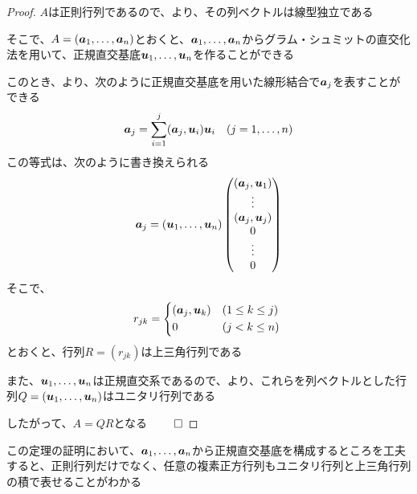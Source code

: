 \documentclass[../../../topic_linear-algebra]{subfiles}
\begin{document}
\begin{proof}
  $A$は正則行列であるので、より、その列ベクトルは線型独立である

  そこで、$A = (\vb*{a}_1,\ldots,\vb*{a}_n)$とおくと、$\vb*{a}_1,\ldots,\vb*{a}_n$からグラム・シュミットの直交化法を用いて、正規直交基底$\vb*{u}_1,\ldots,\vb*{u}_n$を作ることができる

  \br

  このとき、より、次のように正規直交基底を用いた線形結合で$\vb*{a}_j$を表すことができる
  \begin{equation*}
    \vb*{a}_j = \sum_{i=1}^j (\vb*{a}_j, \vb*{u}_i) \vb*{u}_i \quad (j = 1,\ldots,n)
  \end{equation*}
  この等式は、次のように書き換えられる
  \begin{equation*}
    \vb*{a}_j = (\vb*{u}_1,\ldots,\vb*{u}_n) \begin{pmatrix}
      (\vb*{a}_j, \vb*{u}_1) \\
      \vdots                 \\
      (\vb*{a}_j, \vb*{u}_j) \\
      0                      \\
      \vdots                 \\
      0
    \end{pmatrix}
  \end{equation*}
  そこで、
  \begin{equation*}
    r_{jk} = \begin{cases*}
      (\vb*{a}_j, \vb*{u}_k) & ($1 \leq k \leq j$) \\
      0                      & ($j < k \leq n$)
    \end{cases*}
  \end{equation*}
  とおくと、行列$R = (r_{jk})$は上三角行列である

  \br

  また、$\vb*{u}_1,\ldots,\vb*{u}_n$は正規直交系であるので、より、これらを列ベクトルとした行列$Q = (\vb*{u}_1,\ldots,\vb*{u}_n)$はユニタリ行列である

  \br

  したがって、$A = QR$となる $\qed$
\end{proof}

\br

この定理の証明において、$\vb*{a}_1,\ldots,\vb*{a}_n$から正規直交基底を構成するところを工夫すると、正則行列だけでなく、任意の複素正方行列もユニタリ行列と上三角行列の積で表せることがわかる
\end{document}
